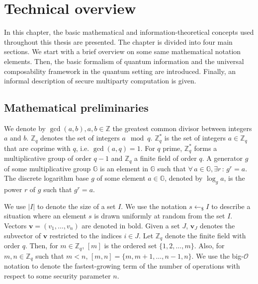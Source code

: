 


%

\chapter{Technical overview}

In this chapter, the basic mathematical and information-theoretical concepts used throughout this thesis are presented. The chapter is divided into four main sections. We start with a brief overview on some same mathematical notation elements. Then, the basic formalism of quantum information and the universal composability framework in the quantum setting are introduced. Finally, an informal description of secure multiparty computation is given.

\section{Mathematical preliminaries}

We denote by $\gcd (a,b), a,b\in\mathbb{Z}$ the greatest common divisor between integers $a$ and $b$. $\mathbb{Z}_q$ denotes the set of integers $a \mod q$. $\mathbb{Z}^*_q$ is the set of integers $a\in\mathbb{Z}_q$ that are coprime with $q$, i.e. $\gcd (a,q) = 1$. For $q$ prime, $\mathbb{Z}^*_q$ forms a multiplicative group of order $q-1$ and $\mathbb{Z}_q$ a finite field of order $q$. A generator $g$ of some multiplicative group $\mathbb{G}$ is an element in $\mathbb{G}$ such that $\forall\,a\in\mathbb{G}, \exists r\, :\, g^r = a$. The discrete logarithm base $g$ of some element $a\in\mathbb{G}$, denoted by $\log_g a$, is the power $r$ of $g$ such that $g^r = a$. 

We use $|I|$ to denote the size of a set $I$. We use the notation $s\leftarrow_{\$}I$ to describe a situation where an element $s$ is drawn uniformly at random from the set $I$. Vectors $\bm{v}= (v_1, \ldots , v_n)$  are denoted in bold. Given a set $J$, $\bm{v}_J$ denotes the subvector of $\bm{v}$ restricted to the indices $i \in J$. Let $\mathbb{Z}_q$ denote the finite field with order $q$. Then, for $m\in \mathbb{Z}_q$, $[m]$ is the ordered set $\{1, 2, \ldots, m\}$. Also, for $m, n\in \mathbb{Z}_q$ such that $m<n$, $[m, n] = \{m, m+1, \dots, n-1, n\}$. We use the big-$\mathcal{O}$ notation to denote the fastest-growing term of the number of operations with respect to some security parameter $n$.

